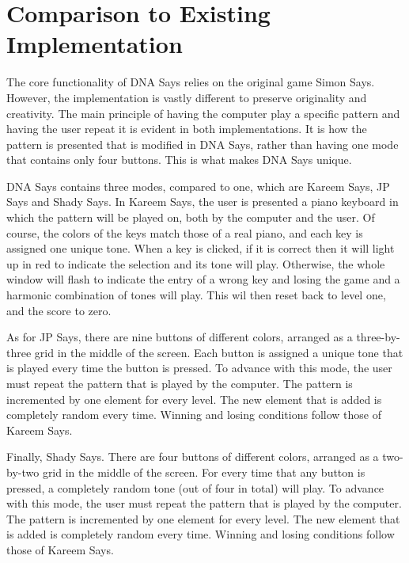 \documentclass[12pt, titlepage]{article}
\begin{document}
	
\section{Comparison to Existing Implementation}	

\par The core functionality of DNA Says relies on the original game Simon Says. However, the implementation is vastly different to preserve originality and creativity. The main principle of having the computer play a specific pattern and having the user repeat it is evident in both implementations. It is how the pattern is presented that is modified in DNA Says, rather than having one mode that contains only four buttons. This is what makes DNA Says unique. 
\\
\par DNA Says contains three modes, compared to one, which are Kareem Says, JP Says and Shady Says. In Kareem Says, the user is presented a piano keyboard in which the pattern will be played on, both by the computer and the user. Of course, the colors of the keys match those of a real piano, and each key is assigned one unique tone. When a key is clicked, if it is correct then it will light up in red to indicate the selection and its tone will play. Otherwise, the whole window will flash to indicate the entry of a wrong key and losing the game and a harmonic combination of tones will play. This wil then reset back to level one, and the score to zero.
\\
\par As for JP Says, there are nine buttons of different colors, arranged as a three-by-three grid in the middle of the screen. Each button is assigned a unique tone that is played every time the button is pressed. To advance with this mode, the user must repeat the pattern that is played by the computer. The pattern is incremented by one element for every level. The new element that is added is completely random every time. Winning and losing conditions follow those of Kareem Says.
\\
\par Finally, Shady Says. There are four buttons of different colors, arranged as a two-by-two grid in the middle of the screen. For every time that any button is pressed, a completely random tone (out of four in total) will play. To advance with this mode, the user must repeat the pattern that is played by the computer. The pattern is incremented by one element for every level. The new element that is added is completely random every time. Winning and losing conditions follow those of Kareem Says.
\end{document}
